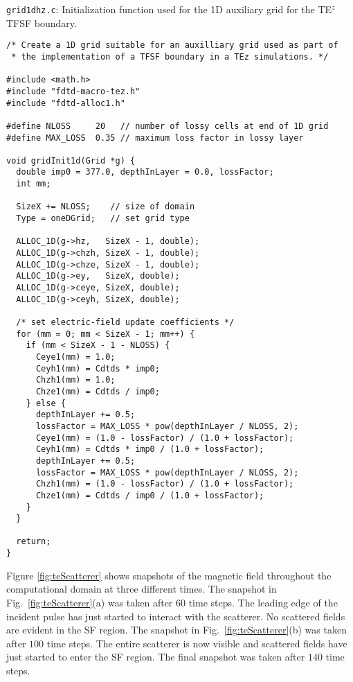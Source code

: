 \begin{program}
{\tt grid1dhz.c}:  Initialization function used for the 1D auxiliary
grid for the TE$^z$ TFSF boundary.
\label{pro:grid1dhz}
\codemiddle
\begin{lstlisting}
/* Create a 1D grid suitable for an auxilliary grid used as part of
 * the implementation of a TFSF boundary in a TEz simulations. */

#include <math.h>
#include "fdtd-macro-tez.h"
#include "fdtd-alloc1.h"

#define NLOSS     20   // number of lossy cells at end of 1D grid
#define MAX_LOSS  0.35 // maximum loss factor in lossy layer

void gridInit1d(Grid *g) {
  double imp0 = 377.0, depthInLayer = 0.0, lossFactor;
  int mm;

  SizeX += NLOSS;    // size of domain
  Type = oneDGrid;   // set grid type

  ALLOC_1D(g->hz,   SizeX - 1, double);
  ALLOC_1D(g->chzh, SizeX - 1, double);
  ALLOC_1D(g->chze, SizeX - 1, double);
  ALLOC_1D(g->ey,   SizeX, double);
  ALLOC_1D(g->ceye, SizeX, double);
  ALLOC_1D(g->ceyh, SizeX, double);
  
  /* set electric-field update coefficients */
  for (mm = 0; mm < SizeX - 1; mm++) {
    if (mm < SizeX - 1 - NLOSS) {
      Ceye1(mm) = 1.0;
      Ceyh1(mm) = Cdtds * imp0;
      Chzh1(mm) = 1.0;
      Chze1(mm) = Cdtds / imp0;
    } else {
      depthInLayer += 0.5;
      lossFactor = MAX_LOSS * pow(depthInLayer / NLOSS, 2);
      Ceye1(mm) = (1.0 - lossFactor) / (1.0 + lossFactor);
      Ceyh1(mm) = Cdtds * imp0 / (1.0 + lossFactor);
      depthInLayer += 0.5;
      lossFactor = MAX_LOSS * pow(depthInLayer / NLOSS, 2);
      Chzh1(mm) = (1.0 - lossFactor) / (1.0 + lossFactor);
      Chze1(mm) = Cdtds / imp0 / (1.0 + lossFactor);
    }
  }

  return;
}
\end{lstlisting}
\end{program}

Figure \ref{fig:teScatterer} shows snapshots of the magnetic field
throughout the computational domain at three different times.  The
snapshot in Fig.\ \ref{fig:teScatterer}(a) was taken after $60$ time
steps.  The leading edge of the incident pulse has just started to
interact with the scatterer.  No scattered fields are evident in the SF
region.  The snapshot in Fig.\ \ref{fig:teScatterer}(b) was taken
after $100$ time steps.  The entire scatterer is now visible and
scattered fields have just started to enter the SF region.  The final
snapshot was taken after $140$ time steps.

